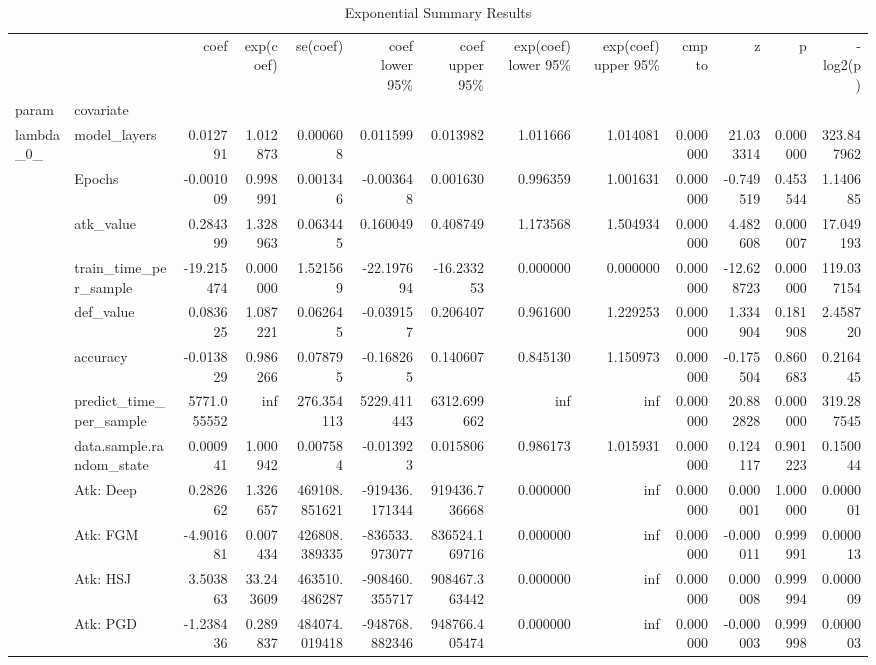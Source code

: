 \begin{table}[htbp]
\caption{Exponential Summary Results}
\label{tab:exponential_summary}
\begin{tabular}{llrrrrrrrrrrr}
\toprule
 &  & coef & exp(coef) & se(coef) & coef lower 95\% & coef upper 95\% & exp(coef) lower 95\% & exp(coef) upper 95\% & cmp to & z & p & -log2(p) \\
param & covariate &  &  &  &  &  &  &  &  &  &  &  \\
\midrule
\multirow[t]{23}{*}{lambda\_0\_} & model\_layers & 0.012791 & 1.012873 & 0.000608 & 0.011599 & 0.013982 & 1.011666 & 1.014081 & 0.000000 & 21.033314 & 0.000000 & 323.847962 \\
 & Epochs & -0.001009 & 0.998991 & 0.001346 & -0.003648 & 0.001630 & 0.996359 & 1.001631 & 0.000000 & -0.749519 & 0.453544 & 1.140685 \\
 & atk\_value & 0.284399 & 1.328963 & 0.063445 & 0.160049 & 0.408749 & 1.173568 & 1.504934 & 0.000000 & 4.482608 & 0.000007 & 17.049193 \\
 & train\_time\_per\_sample & -19.215474 & 0.000000 & 1.521569 & -22.197694 & -16.233253 & 0.000000 & 0.000000 & 0.000000 & -12.628723 & 0.000000 & 119.037154 \\
 & def\_value & 0.083625 & 1.087221 & 0.062645 & -0.039157 & 0.206407 & 0.961600 & 1.229253 & 0.000000 & 1.334904 & 0.181908 & 2.458720 \\
 & accuracy & -0.013829 & 0.986266 & 0.078795 & -0.168265 & 0.140607 & 0.845130 & 1.150973 & 0.000000 & -0.175504 & 0.860683 & 0.216445 \\
 & predict\_time\_per\_sample & 5771.055552 & inf & 276.354113 & 5229.411443 & 6312.699662 & inf & inf & 0.000000 & 20.882828 & 0.000000 & 319.287545 \\
 & data.sample.random\_state & 0.000941 & 1.000942 & 0.007584 & -0.013923 & 0.015806 & 0.986173 & 1.015931 & 0.000000 & 0.124117 & 0.901223 & 0.150044 \\
 & Atk: Deep & 0.282662 & 1.326657 & 469108.851621 & -919436.171344 & 919436.736668 & 0.000000 & inf & 0.000000 & 0.000001 & 1.000000 & 0.000001 \\
 & Atk: FGM & -4.901681 & 0.007434 & 426808.389335 & -836533.973077 & 836524.169716 & 0.000000 & inf & 0.000000 & -0.000011 & 0.999991 & 0.000013 \\
 & Atk: HSJ & 3.503863 & 33.243609 & 463510.486287 & -908460.355717 & 908467.363442 & 0.000000 & inf & 0.000000 & 0.000008 & 0.999994 & 0.000009 \\
 & Atk: PGD & -1.238436 & 0.289837 & 484074.019418 & -948768.882346 & 948766.405474 & 0.000000 & inf & 0.000000 & -0.000003 & 0.999998 & 0.000003 \\

\end{tabular}
\end{table}
